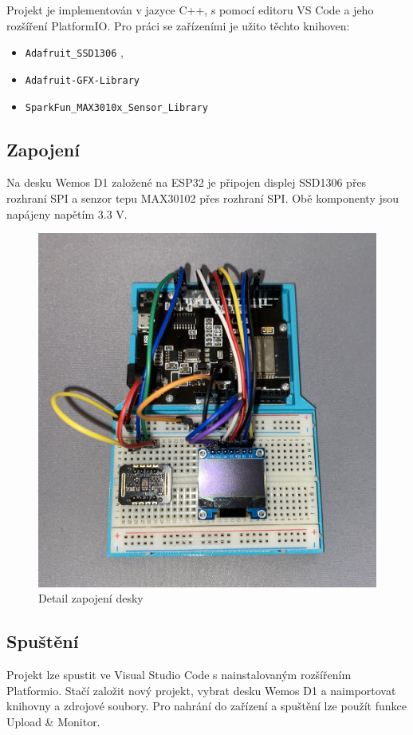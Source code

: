 \documentclass[11pt,a4paper]{article}
\begin{document}
            Projekt je implementován v jazyce C++, s pomocí editoru VS Code a jeho rozšíření PlatformIO. Pro práci se zařízeními
            je užito těchto knihoven:
            
            \begin{itemize}
                \item \verb|Adafruit_SSD1306| \cite{github-ssd1306}, 
                \item \verb|Adafruit-GFX-Library| \cite{github-gfx}
                \item \verb|SparkFun_MAX3010x_Sensor_Library| \cite{github-max3010x}
            \end{itemize}
            
            \subsection{Zapojení}

            Na desku Wemos D1 založené na ESP32 je připojen displej SSD1306 přes rozhraní SPI a senzor tepu MAX30102 přes rozhraní
            SPI. Obě komponenty jsou napájeny napětím 3.3 V.

            \begin{figure}[ht]
        		\centering
        		\includegraphics[width=0.6\linewidth]{img/zapojeni.jpg}
        	    \caption{Detail zapojení desky}
            \end{figure}
                    
            \subsection{Spuštění}

            Projekt lze spustit ve Visual Studio Code s nainstalovaným rozšířením Platformio\cite{pio}. Stačí založit nový
            projekt, vybrat desku Wemos D1 a naimportovat knihovny a zdrojové soubory. Pro nahrání do zařízení a spuštění
            lze použít funkce Upload \& Monitor.
\end{document}
